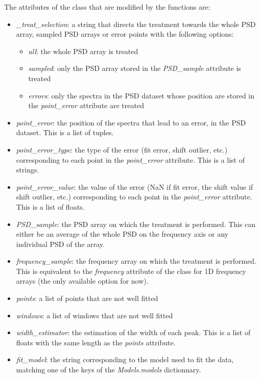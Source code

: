 The attributes of the class that are modified by the functions are:
\begin{itemize}
    \item \textit{\_treat\_selection}: a string that directs the treatment towards the whole PSD array, sampled PSD arrays or error points with the following options:
        \begin{itemize}
            \item \textit{all}: the whole PSD array is treated
            \item \textit{sampled}: only the PSD array stored in the \textit{PSD\_sample} attribute is treated
            \item \textit{errors}: only the spectra in the PSD dataset whose position are stored in the \textit{point\_error} attribute are treated
        \end{itemize}
    \item \textit{point\_error}: the position of the spectra that lead to an error, in the PSD dataset. This is a list of tuples.
    \item \textit{point\_error\_type}: the type of the error (fit error, shift outlier, etc.) corresponding to each point in the \textit{point\_error} attribute. This is a list of strings.
    \item \textit{point\_error\_value}: the value of the error (NaN if fit error, the shift value if shift outlier, etc.) corresponding to each point in the \textit{point\_error} attribute. This is a list of floats.
    \item \textit{PSD\_sample}: the PSD array on which the treatment is performed. This can either be an average of the whole PSD on the frequency axis or any individual PSD of the array.
    \item \textit{frequency\_sample}: the frequency array on which the treatment is performed. This is equivalent to the \textit{frequency} attribute of the class for 1D frequency arrays (the only available option for now).
    \item \textit{points}: a list of points that are not well fitted
    \item \textit{windows}: a list of windows that are not well fitted
    \item \textit{width\_estimator}: the estimation of the width of each peak. This is a list of floats with the same length as the \textit{points} attribute.
    \item \textit{fit\_model}: the string corresponding to the model used to fit the data, matching one of the keys of the \textit{Models.models} dictionnary.

\end{itemize}
